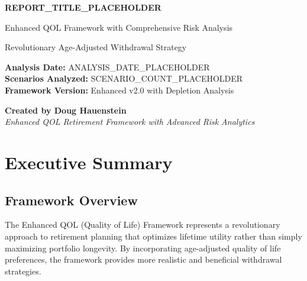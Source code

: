 \documentclass[11pt,a4paper]{article}
\newcommand{\reporttitle}{REPORT_TITLE_PLACEHOLDER}
\newcommand{\analysisdate}{ANALYSIS_DATE_PLACEHOLDER}
\newcommand{\scenariocount}{SCENARIO_COUNT_PLACEHOLDER}
\newcommand{\totalimprovement}{TOTAL_IMPROVEMENT_PLACEHOLDER}
\begin{document}
\begin{titlepage}
    \centering
    \vspace*{2cm}
    
    {\Huge\bfseries\color{primary} \reporttitle\par}
    \vspace{1cm}
    {\LARGE\color{secondary} Enhanced QOL Framework with Comprehensive Risk Analysis\par}
    \vspace{0.5cm}
    {\large\color{gray} Revolutionary Age-Adjusted Withdrawal Strategy\par}
    
    \vspace{2cm}
    
    
    \vspace{2cm}
    
    {\large
    \textbf{Analysis Date:} \analysisdate \\[10pt]
    \textbf{Scenarios Analyzed:} \scenariocount \\[10pt]
    \textbf{Framework Version:} Enhanced v2.0 with Depletion Analysis
    }
    
    \vfill
    
    {\large
    \textbf{Created by Doug Hauenstein} \\
    \textit{Enhanced QOL Retirement Framework with Advanced Risk Analytics}
    }
    
\end{titlepage}

\tableofcontents
\newpage

\section{Executive Summary}

\subsection{Framework Overview}
The Enhanced QOL (Quality of Life) Framework represents a revolutionary approach to retirement planning that optimizes lifetime utility rather than simply maximizing portfolio longevity. By incorporating age-adjusted quality of life preferences, the framework provides more realistic and beneficial withdrawal strategies.
\end{document}
